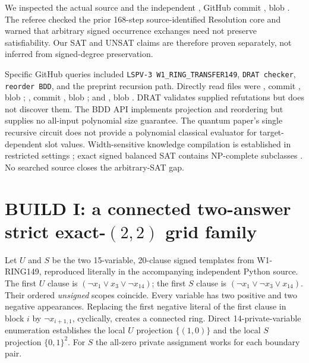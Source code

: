 \documentclass[11pt]{article}
\begin{document}
We inspected the actual source  and the independent , GitHub commit , blob . The referee checked the prior 168-step source-identified Resolution core and warned that arbitrary signed occurrence exchanges need not preserve satisfiability. Our SAT and UNSAT claims are therefore proven separately, not inferred from signed-degree preservation.

Specific GitHub queries included \texttt{LSPV-3 W1\_RING\_TRANSFER149}, \texttt{DRAT checker}, \texttt{reorder BDD}, and the preprint recursion path. Directly read files were , commit , blob ; , commit , blob ; and , blob . DRAT validates supplied refutations but does not discover them. The BDD API implements projection and reordering but supplies no all-input polynomial size guarantee. The quantum paper's single recursive circuit does not provide a polynomial classical evaluator for target-dependent slot values. Width-sensitive knowledge compilation is established in restricted settings \cite{bova2014,amarilli2017}; exact signed balanced SAT contains NP-complete subclasses \cite{docker2019}. No searched source closes the arbitrary-SAT gap.

\section{BUILD I: a connected two-answer strict exact-$(2,2)$ grid family}
Let $U$ and $S$ be the two 15-variable, 20-clause signed templates from W1-RING149, reproduced literally in the accompanying independent Python source. The first $U$ clause is $(\neg x_1\vee x_3\vee\neg x_{14})$; the first $S$ clause is $(\neg x_1\vee\neg x_3\vee x_{14})$. Their ordered \emph{unsigned} scopes coincide. Every variable has two positive and two negative appearances. Replacing the first negative literal of the first clause in block $i$ by $\neg x_{i+1,1}$, cyclically, creates a connected ring. Direct 14-private-variable enumeration establishes the local $U$ projection $\{(1,0)\}$ and the local $S$ projection $\{0,1\}^2$. For $S$ the all-zero private assignment works for each boundary pair.
\end{document}
